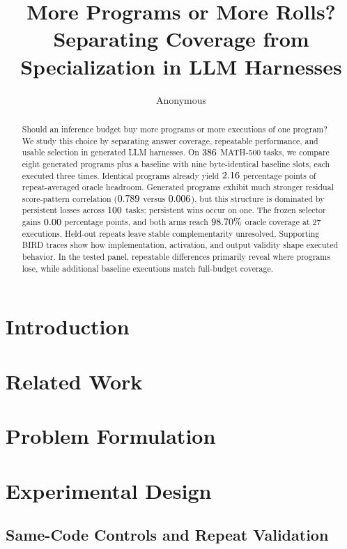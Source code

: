 \documentclass{article}
\title{More Programs or More Rolls?\\Separating Coverage from Specialization in LLM Harnesses}
\author{Anonymous}
\begin{document}
\maketitle

\begin{abstract}
Should an inference budget buy more programs or more executions of
one program? We study this choice by separating answer coverage,
repeatable performance, and usable selection in generated LLM harnesses.
On $386$ MATH-500 tasks, we compare eight generated programs
plus a baseline with nine byte-identical baseline slots, each executed
three times. Identical programs already yield $2.16$ percentage
points of repeat-averaged oracle headroom. Generated programs exhibit
much stronger residual score-pattern correlation
($0.789$ versus $0.006$), but this structure is dominated
by persistent losses across $100$ tasks; persistent wins occur
on one. The frozen selector gains $0.00$ percentage points,
and both arms reach $98.70\%$ oracle coverage at
27 executions. Held-out repeats leave stable complementarity unresolved.
Supporting BIRD traces show how implementation, activation, and output
validity shape executed behavior. In the tested panel, repeatable differences primarily reveal
where programs lose, while additional baseline executions match
full-budget coverage.
\end{abstract}

\section{Introduction}\label{sec:introduction}


\section{Related Work}\label{sec:related}


\section{Problem Formulation}\label{sec:measures}


\section{Experimental Design}\label{sec:setup}

\subsection{Same-Code Controls and Repeat Validation}\label{sec:protocol}

\end{document}
